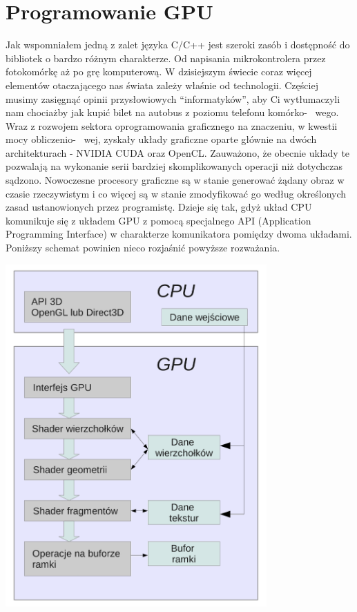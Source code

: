 \documentclass{article}
\begin{document}
\section*{\textbf{Programowanie GPU}}
Jak wspomniałem jedną z zalet języka C/C++ jest szeroki zasób i dostępność do bibliotek o bardzo różnym charakterze. Od napisania mikrokontrolera przez fotokomórkę aż po grę komputerową. W dzisiejszym świecie coraz więcej elementów otaczającego nas świata zależy właśnie od technologii. Częściej musimy zasięgnąć opinii przysłowiowych “informatyków”, aby Ci wytłumaczyli nam chociażby jak kupić bilet na autobus z poziomu telefonu komórko- \ wego. Wraz z rozwojem sektora oprogramowania graficznego na znaczeniu, w kwestii mocy obliczenio- \ wej, zyskały układy graficzne oparte głównie na dwóch architekturach - NVIDIA CUDA oraz OpenCL. Zauważono, że obecnie układy te pozwalają na wykonanie serii bardziej skomplikowanych operacji niż dotychczas sądzono. Nowoczesne procesory graficzne są w stanie generować żądany obraz w czasie rzeczywistym i co więcej są w stanie zmodyfikować go według określonych zasad ustanowionych przez programistę. Dzieje się tak, gdyż układ CPU komunikuje się z układem GPU z pomocą specjalnego API (Application Programming Interface) w charakterze komunikatora pomiędzy dwoma układami. Poniższy schemat powinien nieco rozjaśnić powyższe rozważania.
\begin{center}
\includegraphics[width=10cm]{gpu}
\end{center}
\end{document}
